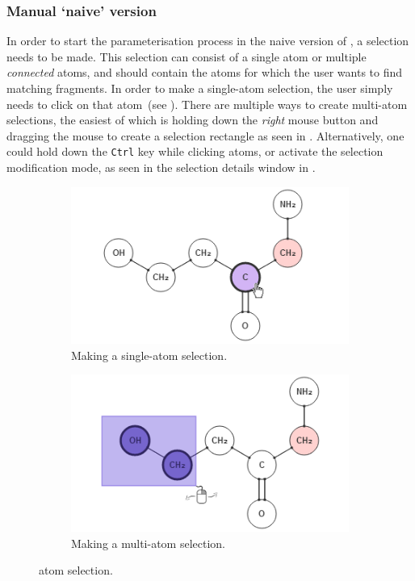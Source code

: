 \subsubsection{Manual `naive' version}
In order to start the parameterisation process in the naive version of \oframp, a selection needs to be made. This selection can consist of a single atom or multiple \emph{connected} atoms, and should contain the atoms for which the user wants to find matching fragments. In order to make a single-atom selection, the user simply needs to click on that atom~(see ). There are multiple ways to create multi-atom selections, the easiest of which is holding down the \emph{right} mouse button and dragging the mouse to create a selection rectangle as seen in . Alternatively, one could hold down the \verb|Ctrl| key while clicking atoms, or activate the selection modification mode, as seen in the selection details window in .

\begin{figure}
\centering
\begin{subfigure}[t]{0.45\textwidth}
\centering
\includegraphics[width=\textwidth]{img/select_1.png}
\caption{Making a single-atom selection.}
\end{subfigure}%
\qquad
\begin{subfigure}[t]{0.45\textwidth}
\centering
\includegraphics[width=\textwidth]{img/select_2.png}
\caption{Making a multi-atom selection.}
\end{subfigure}
\caption{\oframp{} atom selection.}
\end{figure}

